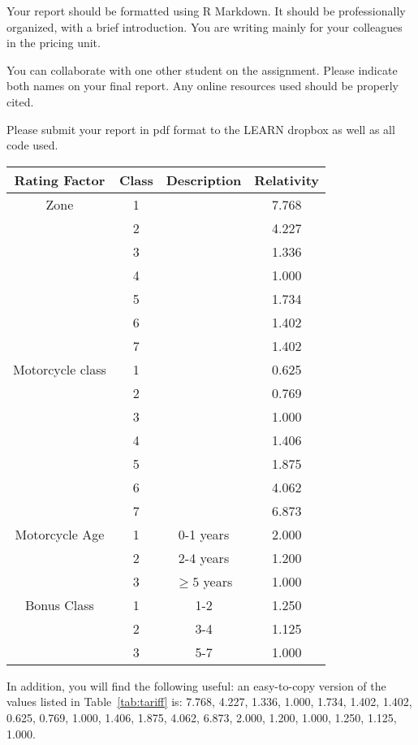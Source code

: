 \documentclass[11pt]{article}
\begin{document}
Your report should be formatted using R Markdown. It should be professionally organized, with a brief introduction. You are writing mainly for your colleagues in the pricing unit.

You can collaborate with one other student on the assignment. Please indicate both names on your final report. Any online resources used should be properly cited.

Please submit your report in pdf format to the LEARN dropbox as well as all code used. 

\newpage

\begin{table*}[htbp]
  \caption{Current tariff rating factors and relativities}
  \begin{center}
\begin{tabular}{|c|c|c|c|}
\hline
Rating Factor & Class & Description & Relativity \\
\hline
Zone & 1 & &7.768\\
&2 & & 4.227 \\
&3&& 1.336 \\
&4&& 1.000 \\
&5& & 1.734 \\
& 6&& 1.402 \\
&7&&1.402 \\
\hline
Motorcycle class & 1& & 0.625 \\
&2&& 0.769 \\
&3&& 1.000 \\
&4& & 1.406 \\
&5&& 1.875 \\
&6&& 4.062 \\
&7&&6.873 \\
\hline
Motorcycle Age & 1 & 0-1 years & 2.000\\
&2&2-4 years & 1.200\\
&3& $\ge 5$ years & 1.000 \\
\hline
Bonus Class & 1 & 1-2 & 1.250 \\
&2& 3-4 & 1.125\\
&3& 5-7 & 1.000 \\
\hline
\end{tabular}
\end{center}
\label{tab:tariff}
\end{table*}


In addition, you will find the following useful: an easy-to-copy version of the values listed in Table~\ref{tab:tariff} is:
7.768, 4.227, 1.336, 1.000, 1.734, 1.402, 1.402,
0.625, 0.769, 1.000, 1.406, 1.875, 4.062, 6.873,
2.000, 1.200, 1.000,
1.250, 1.125, 1.000.


 
\end{document}
